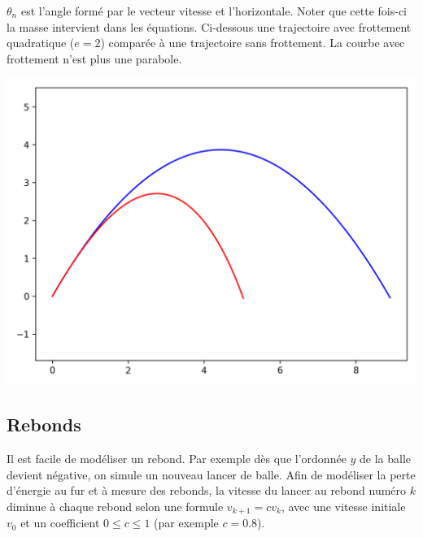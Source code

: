 \documentclass[11pt,class=report,crop=false]{standalone}
\begin{document}

$\theta_n$ est l'angle formé par le vecteur vitesse et l'horizontale.
Noter que cette fois-ci la masse intervient dans les équations.
Ci-dessous une trajectoire avec frottement quadratique ($e=2$) comparée à une trajectoire sans frottement. La courbe avec frottement n'est plus une parabole.

\begin{center}
	\includegraphics[scale=\myscale,scale=0.5]{figures/balle-frottements}
\end{center}


\subsection{Rebonds}

Il est facile de modéliser un rebond. Par exemple dès que l'ordonnée $y$ de la balle devient négative, on simule un nouveau lancer de balle. Afin de modéliser la perte d'énergie au fur et à mesure des rebonds, la vitesse du lancer au rebond numéro $k$ diminue à chaque rebond selon une formule $v_{k+1} = c v_k$, avec une vitesse initiale $v_0$ et un coefficient $0 \le c \le 1$ (par exemple $c=0.8$).
\end{document}
